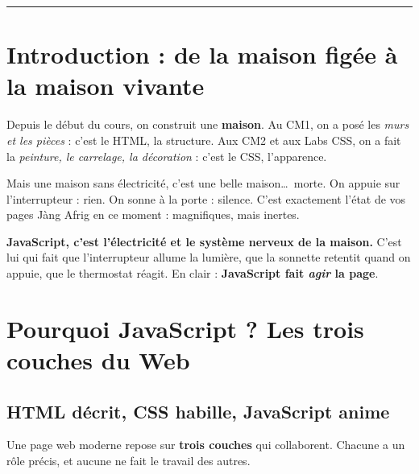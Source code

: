 \documentclass[11pt,a4paper]{article}
\begin{document}
\tableofcontents
\bigskip
\hrule
\bigskip

\section*{Introduction : de la maison figée à la maison vivante}

Depuis le début du cours, on construit une \textbf{maison}. Au CM1, on a posé les \emph{murs et les pièces} : c'est le HTML, la structure. Aux CM2 et aux Labs CSS, on a fait la \emph{peinture, le carrelage, la décoration} : c'est le CSS, l'apparence.

Mais une maison sans électricité, c'est une belle maison\ldots\ morte. On appuie sur l'interrupteur : rien. On sonne à la porte : silence. C'est exactement l'état de vos pages Jàng Afrig en ce moment : magnifiques, mais inertes.

\textbf{JavaScript, c'est l'électricité et le système nerveux de la maison.} C'est lui qui fait que l'interrupteur allume la lumière, que la sonnette retentit quand on appuie, que le thermostat réagit. En clair : \textbf{JavaScript fait \emph{agir} la page}.

\begin{center}
\end{center}

\section{Pourquoi JavaScript ? Les trois couches du Web}

\subsection{HTML décrit, CSS habille, JavaScript anime}

Une page web moderne repose sur \textbf{trois couches} qui collaborent. Chacune a un rôle précis, et aucune ne fait le travail des autres.
\end{document}
